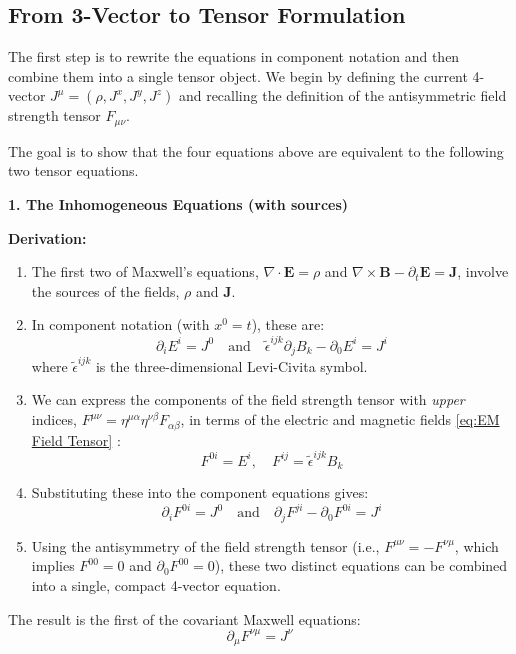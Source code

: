 \documentclass[11pt, a4paper]{report}
\begin{document}
\subsection*{From 3-Vector to Tensor Formulation}

The first step is to rewrite the equations in component notation and then combine them into a single tensor object. We begin by defining the current 4-vector $J^\mu = (\rho, J^x, J^y, J^z)$ and recalling the definition of the antisymmetric field strength tensor $F_{\mu\nu}$.

The goal is to show that the four equations above are equivalent to the following two tensor equations.

\textbf{1. The Inhomogeneous Equations (with sources)}

\textbf{Derivation:}
\begin{enumerate}
    \item The first two of Maxwell's equations, $\nabla \cdot \mathbf{E} = \rho$ and $\nabla \times \mathbf{B} - \partial_t \mathbf{E} = \mathbf{J}$, involve the sources of the fields, $\rho$ and $\mathbf{J}$.
    \item In component notation (with $x^0=t$), these are:
    \[
        \partial_i E^i = J^0 \quad \text{and} \quad \tilde{\epsilon}^{ijk}\partial_j B_k - \partial_0 E^i = J^i
    \]
    where $\tilde{\epsilon}^{ijk}$ is the three-dimensional Levi-Civita symbol.
    \item We can express the components of the field strength tensor with \emph{upper} indices, $F^{\mu\nu} = \eta^{\mu\alpha}\eta^{\nu\beta}F_{\alpha\beta}$, in terms of the electric and magnetic fields \eqref{eq:EM Field Tensor} :
    \begin{equation}
        F^{0i} = E^i, \quad F^{ij} = \tilde{\epsilon}^{ijk}B_k
    \end{equation}
    \item Substituting these into the component equations gives:
    \begin{equation}
        \partial_i F^{0i} = J^0 \quad \text{and} \quad \partial_j F^{ji} - \partial_0 F^{0i} = J^i
    \end{equation}
    \item Using the antisymmetry of the field strength tensor (i.e., $F^{\mu\nu} = -F^{\nu\mu}$, which implies $F^{00}=0$ and $\partial_0 F^{00}=0$), these two distinct equations can be combined into a single, compact 4-vector equation.
\end{enumerate}
The result is the first of the covariant Maxwell equations:
\begin{equation}\label{eq:inhom-maxwell}
    \partial_\mu F^{\nu\mu} = J^\nu
\end{equation}
\end{document}
